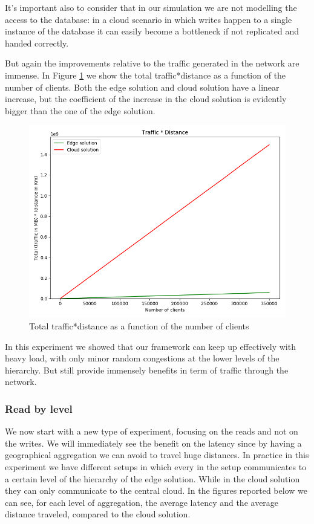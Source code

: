 It's important also to consider that in our simulation we are not modelling the access to the database: in a cloud scenario in which writes happen to a single instance of the database it can easily become a bottleneck if not replicated and handed correctly.

But again the improvements relative to the traffic generated in the network are immense. In Figure \ref{fig:/write-all-clients-traffic} we show the total traffic*distance as a function of the number of clients. Both the edge solution and cloud solution have a linear increase, but the coefficient of the increase in the cloud solution is evidently bigger than the one of the edge solution.

\begin{figure}[H]
    \centering
    \includegraphics[width=0.95\linewidth]{Figures/Evaluation/write-all-clients-traffic.png}
    \caption{Total traffic*distance as a function of the number of clients}
    \label{fig:/write-all-clients-traffic}
\end{figure}

In this experiment we showed that our framework can keep up effectively with heavy load, with only minor random congestions at the lower levels of the hierarchy. But still provide immensely benefits in term of traffic through the network.


\subsubsection{Read by level}
We now start with a new type of experiment, focusing on the reads and not on the writes. We will immediately see the benefit on the latency since by having a geographical aggregation we can avoid to travel huge distances.
In practice in this experiment we have different setups in which every  in the setup communicates to a certain level of the hierarchy of the edge solution. While in the cloud solution they can only communicate to the central cloud.
In the figures reported below we can see, for each level of aggregation, the average latency and the average distance traveled, compared to the cloud solution.

